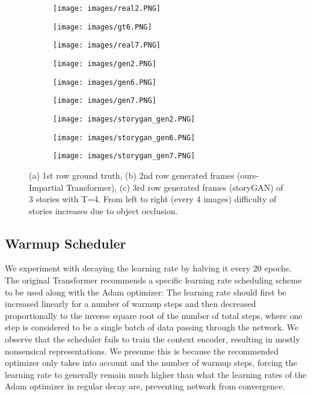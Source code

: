 \documentclass{article}
\begin{document}
\begin{figure*}[h!]
    \centering
    \begin{subfigure}{0.33\textwidth}
        \texttt{[image: images/real2.PNG]}
\end{subfigure}
    \begin{subfigure}{0.33\textwidth}
        \texttt{[image: images/gt6.PNG]}
\end{subfigure}
    \begin{subfigure}{0.33\textwidth}
        \texttt{[image: images/real7.PNG]}
\end{subfigure}
    \begin{subfigure}{0.33\textwidth}
        \texttt{[image: images/gen2.PNG]}
\end{subfigure}
        \begin{subfigure}{0.33\textwidth}
        \texttt{[image: images/gen6.PNG]}
\end{subfigure}
    \begin{subfigure}{0.33\textwidth}
        \texttt{[image: images/gen7.PNG]}
\end{subfigure}
      \begin{subfigure}{0.33\textwidth}
        \texttt{[image: images/storygan\_gen2.PNG]}
\end{subfigure}
        \begin{subfigure}{0.33\textwidth}
        \texttt{[image: images/storygan\_gen6.PNG]}
\end{subfigure}
    \begin{subfigure}{0.33\textwidth}
        \texttt{[image: images/storygan\_gen7.PNG]}
\end{subfigure}
    \caption{(a) 1st row ground truth, (b) 2nd row generated frames (ours-Impartial Transformer), (c) 3rd row generated frames (storyGAN) of 3 stories with T=4. From left to right (every 4 images) difficulty of stories increases due to object occlusion.}
    \label{fig:examples}
\end{figure*}

\subsection{Warmup Scheduler}
We  experiment with decaying the learning rate by halving it every 20 epochs.
The original Transformer \cite{transformer} recommends a specific learning rate scheduling scheme to be used along with the Adam optimizer: The learning rate should first be increased linearly for a number of warmup
steps and then decreased proportionally to the inverse square root of the number of total steps, where one step is considered to be a single batch of data passing through the network. We observe that the scheduler fails to train the context encoder, resulting in mostly nonsensical representations. We presume this is because the recommended optimizer only takes into account  and the number of warmup steps, forcing the learning rate to generally remain much
higher than what the learning rates of the Adam optimizer in regular decay are,  preventing network
from convergence.
\end{document}
